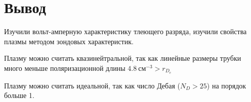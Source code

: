 \documentclass[a4paper, 12pt]{article}
\begin{document}
    \section{Вывод}

        Изучили вольт-амперную характеристику тлеющего разряда, изучили свойства плазмы методом зондовых характеристик.


        Плазму можно считать квазинейтральной, так как линейные размеры трубки много меньше поляризационной длины $4.8~см^{-3}> r_{D_e}$

        Плазму можно считать идеальной, так как число Дебая ($N_D > 25$) на порядок больше 1.
\end{document}
